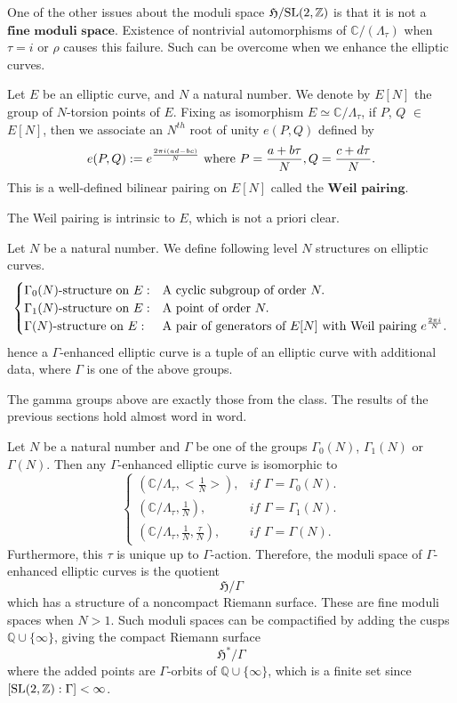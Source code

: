 \documentclass[a4paper,11pt]{article}
\begin{document}
One of the other issues about the moduli space $\mathfrak{H}/\textnormal{SL}(2,\mathbb{Z})$ is that it is not a $\textbf{fine moduli space}$.
Existence of nontrivial automorphisms of $\mathbb{C}/(\Lambda_{\tau})$ when $\tau=i$ or $\rho$ causes this failure.
Such can be overcome when we enhance the elliptic curves.

\begin{defn}
Let $E$ be an elliptic curve, and $N$ a natural number.
We denote by $E[N]$ the group of $N$-torsion points of $E$.
Fixing as isomorphism $E\simeq\mathbb{C}/\Lambda_{\tau}$, if $P$, $Q$ $\in$ $E[N]$, then we associate an $N^{th}$ root of unity $e(P,Q)$ defined by
\[
e(P,Q):=e^{\frac{2\pi i(ad-bc)}{N}} \textnormal{ where } P=\frac{a+b\tau}{N}, Q=\frac{c+d\tau}{N}.
\]
This is a well-defined bilinear pairing on $E[N]$ called the $\textbf{Weil pairing}$.
\end{defn}

The Weil pairing is intrinsic to $E$, which is not a priori clear.

\begin{defn}
Let $N$ be a natural number.
We define following level $N$ structures on elliptic curves.
\[
\begin{cases}
\Gamma_0(N)\textnormal{-structure on }E: & \textnormal{A cyclic subgroup of order }N.\\
\Gamma_1(N)\textnormal{-structure on }E: & \textnormal{A point of order }N.\\
\Gamma(N)\textnormal{-structure on }E: & \textnormal{A pair of generators of }E[N] \textnormal{ with Weil pairing } e^{\frac{2\pi i}{N}}.
\end{cases}
\]
hence a $\Gamma$-enhanced elliptic curve is a tuple of an elliptic curve with additional data, where $\Gamma$ is one of the above groups.
\end{defn}

The gamma groups above are exactly those from the class.
The results of the previous sections hold almost word in word.

\begin{thm}
Let $N$ be a natural number and $\Gamma$ be one of the groups $\Gamma_0(N)$, $\Gamma_1(N)$ or $\Gamma(N)$.
Then any $\Gamma$-enhanced elliptic curve is isomorphic to 
\[
\begin{cases}
(\mathbb{C}/\Lambda_{\tau},<\frac{1}{N}>), &\textit{if  }\Gamma=\Gamma_0(N).\\
(\mathbb{C}/\Lambda_{\tau},\frac{1}{N}), &\textit{if  }\Gamma=\Gamma_1(N).\\
(\mathbb{C}/\Lambda_{\tau},\frac{1}{N},\frac{\tau}{N}),  &\textit{if  }\Gamma=\Gamma(N).
\end{cases}
\]
Furthermore, this $\tau$ is unique up to  $\Gamma$-action.
Therefore, the moduli space of  $\Gamma$-enhanced elliptic curves is the quotient
\[
\mathfrak{H}/\Gamma
\]
which has a structure of a noncompact Riemann surface.
These are fine moduli spaces when $N>1$.
Such moduli spaces can be compactified by adding the cusps $\mathbb{Q}\cup\{\infty\}$, giving the compact Riemann surface
\[
\mathfrak{H}^*/\Gamma
\]
where the added points are $\Gamma$-orbits of $\mathbb{Q}\cup\{\infty\}$, which is a finite set since $[\textnormal{SL}(2,\mathbb{Z}):\Gamma]<\infty$.
\end{thm}
\end{document}
